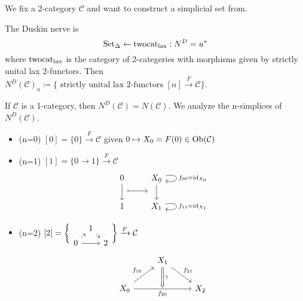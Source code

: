 We fix a 2-category $ \mathcal{ C } $ and want to construct a simplicial set from.


\begin{defi}
	The Duskin nerve is 
	\[
		\operatorname{Set}_{\Delta}
		\xleftarrow{}
		\operatorname{twocat_{lax}} : N^D = u^*
	\]
	where $ \operatorname{twocat_{lax}} $ is the category of 2-categeries with morphisms given by strictly unital lax 2-functors.
	Then $ N^D ( \mathcal{ C } )_n \coloneqq \{ \text{ strictly unital lax 2-functors } [ n ] \xrightarrow{ F } \mathcal{ C } \} $. 
\end{defi}

\begin{rmk}
\cite{Kerodon}
	If $ \mathcal{C} $ is a 1-category, then $ N^D ( \mathcal{ C } ) = N ( \mathcal{ C } ) $.
	We analyze the n-simplices of $ N^D ( \mathcal{ C } ) $.
	\begin{itemize}
		\item 
		(n=0) $ [ 0 ] = \{ 0 \} \xrightarrow{ F } \mathcal{ C } $ given $ 0 \mapsto X_0 = F ( 0 ) \in \operatorname{Ob}( \mathcal{ C } ) $
		
		\item 
		(n=1)
		 $ [ 1 ] = \{ 0 \to 1 \} \xrightarrow{ F } \mathcal{ C } $
		 \[
		 \begin{tikzcd}
		 	0
		 	\ar[d] 
		 	\ar[r, mapsto, shift right=1.5em]
		 	&
		 	X_0
		 	\ar[d] 
		 	\ar[loop right, " f_{00} = \id_{X_0}"]
		 	\\
		 	1
		 	&
		 	X_1
		 	\ar[loop right, " f_{11} = \id_{ X_1 } " ]
		 \end{tikzcd}
		 \]
		 
		 \item 
		 (n=2)
		 $ [ 2 ] = 
		 \bigg\{
		 \begin{tikzcd}[column sep=1ex,row sep=1ex]
		 	&
		 	1
		 	\ar[rd]
		 	&
		 	\\
		 	0
		 	\ar[rr]
		 	\ar[ru] 
		 	&&
		 	2
		 \end{tikzcd}	
		 \bigg\}
		 \xrightarrow{F}
		 \mathcal{ C }
		 $
		 \[
		 \begin{tikzcd}	
		 	&
		 	X_1
		 	\ar[rd, "f_{21}"]
		 	\ar[d, Rightarrow, "\gamma"] 
		 	&
		 	\\
		 	X_0
		 	\ar[ru, "f_{10}" ]
		 	\ar[rr, "f_{20}"' ]
		 	&
		 	{}
		 	&
		 	X_2
		 \end{tikzcd}
		 \]
		 

\end{itemize}
\end{rmk}
